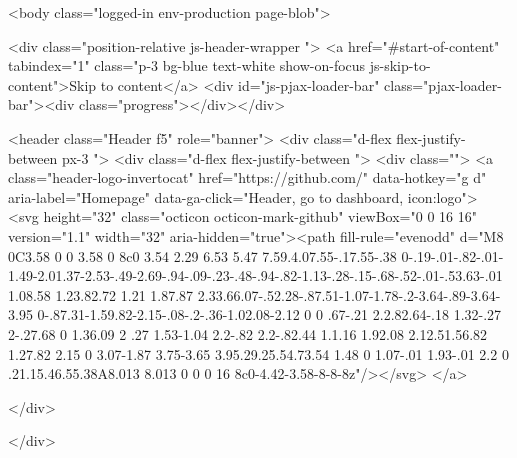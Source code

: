   <body class="logged-in env-production page-blob">
    

  <div class="position-relative js-header-wrapper ">
    <a href="#start-of-content" tabindex="1" class="p-3 bg-blue text-white show-on-focus js-skip-to-content">Skip to content</a>
    <div id="js-pjax-loader-bar" class="pjax-loader-bar"><div class="progress"></div></div>

    
    
    


        
<header class="Header  f5" role="banner">
  <div class="d-flex flex-justify-between px-3 ">
    <div class="d-flex flex-justify-between ">
      <div class="">
        <a class="header-logo-invertocat" href="https://github.com/" data-hotkey="g d" aria-label="Homepage" data-ga-click="Header, go to dashboard, icon:logo">
  <svg height="32" class="octicon octicon-mark-github" viewBox="0 0 16 16" version="1.1" width="32" aria-hidden="true"><path fill-rule="evenodd" d="M8 0C3.58 0 0 3.58 0 8c0 3.54 2.29 6.53 5.47 7.59.4.07.55-.17.55-.38 0-.19-.01-.82-.01-1.49-2.01.37-2.53-.49-2.69-.94-.09-.23-.48-.94-.82-1.13-.28-.15-.68-.52-.01-.53.63-.01 1.08.58 1.23.82.72 1.21 1.87.87 2.33.66.07-.52.28-.87.51-1.07-1.78-.2-3.64-.89-3.64-3.95 0-.87.31-1.59.82-2.15-.08-.2-.36-1.02.08-2.12 0 0 .67-.21 2.2.82.64-.18 1.32-.27 2-.27.68 0 1.36.09 2 .27 1.53-1.04 2.2-.82 2.2-.82.44 1.1.16 1.92.08 2.12.51.56.82 1.27.82 2.15 0 3.07-1.87 3.75-3.65 3.95.29.25.54.73.54 1.48 0 1.07-.01 1.93-.01 2.2 0 .21.15.46.55.38A8.013 8.013 0 0 0 16 8c0-4.42-3.58-8-8-8z"/></svg>
</a>

      </div>

    </div>

